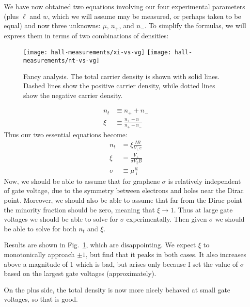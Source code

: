 \documentclass[twocolumn]{revtex4-1}
\begin{document}
We have now obtained two equations involving our four experimental
parameters (plus $\ell$ and $w$, which we will assume may be measured,
or perhaps taken to be equal) and now three unknowns:  $\mu$, $n_+$,
and $n_-$.  To simplify the formulas, we will express them in terms of
two combinations of densities:
\begin{figure}
  \texttt{[image: hall-measurements/xi-vs-vg]}
  \texttt{[image: hall-measurements/nt-vs-vg]}
  \caption{Fancy analysis.  The total carrier density is shown with
    solid lines.  Dashed lines show the positive carrier density,
    while dotted lines show the negative carrier density.}
  \label{fig:nice}
\end{figure}
\begin{align}
  n_t &\equiv n_+ + n_- \\
  \xi &\equiv \frac{n_+ - n_-}{n_+ + n_-}
\end{align}
Thus our two essential equations become:
\begin{align}
  n_t &= \xi\frac{IB}{V_\perp e} \\
  \xi  &= \frac{V_\perp}{\sigma V_\parallel B} \\
  \sigma &\equiv \mu \frac{w}{l}
\end{align}
Now, we should be able to assume that for graphene $\sigma$ is
relatively independent of gate voltage, due to the symmetry between
electrons and holes near the Dirac point.  Moreover, we should also be
able to assume that far from the Dirac point the minority fraction
should be zero, meaning that $\xi \rightarrow 1$.  Thus at large gate
voltages we should be able to solve for $\sigma$ experimentally.  Then
given $\sigma$ we should be able to solve for both $n_t$ and $\xi$.

Results are shown in Fig.~\ref{fig:nice}, which are disappointing.  We
expect $\xi$ to monotonically approach $\pm 1$, but find that it peaks
in both cases.  It also increases above a magnitude of 1 which is bad,
but arises only because I set the value of $\sigma$ based on the
largest gate voltages (approximately).

On the plus side, the total density is now more nicely behaved at
small gate voltages, so that is good.
\end{document}

